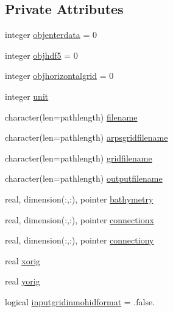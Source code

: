 \subsection*{Private Attributes}
\begin{DoxyCompactItemize}
\item 
integer \mbox{\hyperlink{structmodulearpstoww3_1_1t__mm5format_af6c09ff5eca431e8e9594e42cccd8def}{objenterdata}} = 0
\item 
integer \mbox{\hyperlink{structmodulearpstoww3_1_1t__mm5format_af884590c66fcb02244ea0342e3bdc131}{objhdf5}} = 0
\item 
integer \mbox{\hyperlink{structmodulearpstoww3_1_1t__mm5format_aca64b479e8636edaffb055042cd43b4a}{objhorizontalgrid}} = 0
\item 
integer \mbox{\hyperlink{structmodulearpstoww3_1_1t__mm5format_aba36bc2ac52e778b73252ee3051c87d0}{unit}}
\item 
character(len=pathlength) \mbox{\hyperlink{structmodulearpstoww3_1_1t__mm5format_a171ab0ffbcfaab8dbe6913d8334aee34}{filename}}
\item 
character(len=pathlength) \mbox{\hyperlink{structmodulearpstoww3_1_1t__mm5format_aae9eb44ff00aec14426a4d2ca8d127a9}{arpsgridfilename}}
\item 
character(len=pathlength) \mbox{\hyperlink{structmodulearpstoww3_1_1t__mm5format_ab78235abe68b0d821fb501b6bdefabc0}{gridfilename}}
\item 
character(len=pathlength) \mbox{\hyperlink{structmodulearpstoww3_1_1t__mm5format_a7aaef99a10c0f2a3b7b0d3060b226afa}{outputfilename}}
\item 
real, dimension(\+:,\+:), pointer \mbox{\hyperlink{structmodulearpstoww3_1_1t__mm5format_abcef9c5d3e1abd22287eba7fbec34fba}{bathymetry}}
\item 
real, dimension(\+:,\+:), pointer \mbox{\hyperlink{structmodulearpstoww3_1_1t__mm5format_ad413cfbef9d699b84689f111a9eb9d14}{connectionx}}
\item 
real, dimension(\+:,\+:), pointer \mbox{\hyperlink{structmodulearpstoww3_1_1t__mm5format_a8710792c16cf944bdb4bd94c11d5b074}{connectiony}}
\item 
real \mbox{\hyperlink{structmodulearpstoww3_1_1t__mm5format_af0ec570cab6d64278b851d641441c54e}{xorig}}
\item 
real \mbox{\hyperlink{structmodulearpstoww3_1_1t__mm5format_a818454401969c15e3936cc6cca9f6ee8}{yorig}}
\item 
logical \mbox{\hyperlink{structmodulearpstoww3_1_1t__mm5format_a4d67c32e225fd0a64bbdbf48ac6e679c}{inputgridinmohidformat}} = .false.

\end{DoxyCompactItemize}
